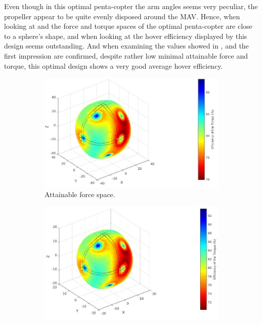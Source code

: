 Even though in this optimal penta-copter the arm angles seems very
peculiar, the propeller appear to be quite evenly disposed around the
MAV. Hence, when looking at   and
 the force and torque spaces of the
optimal penta-copter are close to a sphere’s shape, and when
looking at  the hover efficiency
displayed by this design seems outstanding. And when
examining the values showed in ,
 and 
the first impression are confirmed, despite rather low minimal attainable
force and torque, this optimal design shows a very good average hover
efficiency.

\begin{figure}[!ht]
  \begin{center}
    \begin{subfigure}[b]{0.45\textwidth}
    \includegraphics[width=\linewidth]{images/Penta_fspace.jpg}
    \caption{Attainable force space.} \label{fig:penta_fspace}
    \end{subfigure}
    \hspace*{\fill} %
    \begin{subfigure}[b]{0.43\textwidth}
      \includegraphics[width=\linewidth]{images/Penta_tspace.jpg}

\end{subfigure}
\end{center}
\end{figure}
